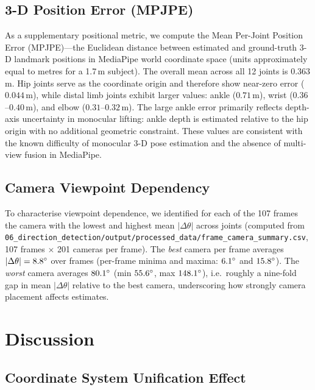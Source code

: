 \documentclass[twocolumn]{article}
\begin{document}
\subsection{3-D Position Error (MPJPE)}

As a supplementary positional metric, we compute the Mean Per-Joint
Position Error (MPJPE)---the Euclidean distance between estimated and
ground-truth 3-D landmark positions in MediaPipe world coordinate space
(units approximately equal to metres for a 1.7\,m subject).
The overall mean across all 12 joints is $0.363$\,m.
Hip joints serve as the coordinate origin and therefore show near-zero
error ($0.044$\,m), while distal limb joints exhibit larger values:
ankle ($0.71$\,m), wrist ($0.36$--$0.40$\,m), and elbow
($0.31$--$0.32$\,m).
The large ankle error primarily reflects depth-axis uncertainty in
monocular lifting: ankle depth is estimated relative to the hip origin
with no additional geometric constraint.
These values are consistent with the known difficulty of monocular 3-D
pose estimation and the absence of multi-view fusion in MediaPipe.

\subsection{Camera Viewpoint Dependency}
\label{subsec:camera_dep}

To characterise viewpoint dependence, we identified for each of the
107 frames the camera with the lowest and highest mean $|\Delta\theta|$
across joints (computed from
\texttt{06\_direction\_detection/output/processed\_data/frame\_camera\_summary.csv},
107 frames $\times$ 201 cameras per frame).
The \emph{best} camera per frame averages $|\Delta\theta|=8.8\degree{}$ over frames
(per-frame minima and maxima: $6.1\degree{}$ and $15.8\degree{}$).
The \emph{worst} camera averages $80.1\degree{}$ (min $55.6\degree{}$, max $148.1\degree{}$),
i.e.\ roughly a nine-fold gap in mean $|\Delta\theta|$ relative to the best camera,
underscoring how strongly camera placement affects estimates.

\section{Discussion}

\subsection{Coordinate System Unification Effect}
\end{document}
